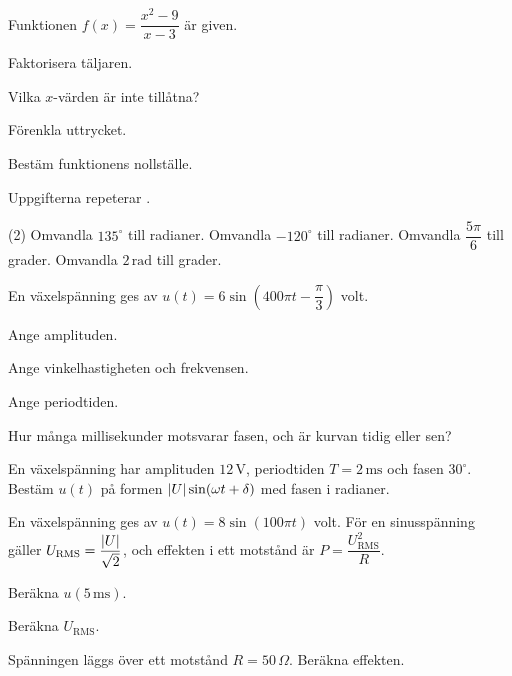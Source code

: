 Funktionen $f(x) = \dfrac{x^2 - 9}{x - 3}$ är given.
\begin{parts}
  \item Faktorisera täljaren.
  \item Vilka $x$-värden är inte tillåtna?
  \item Förenkla uttrycket.
  \item Bestäm funktionens nollställe.
\end{parts}

Uppgifterna repeterar .

\begin{delar}(2)
  \task Omvandla $135^{\circ}$ till radianer.
  \task Omvandla $-120^{\circ}$ till radianer.
  \task Omvandla $\dfrac{5\pi}{6}$ till grader.
  \task Omvandla $2\,\text{rad}$ till grader.
\end{delar}

En växelspänning ges av $u(t) = 6\sin\left(400\pi t - \dfrac{\pi}{3}\right)$ volt.
\begin{parts}
  \item Ange amplituden.
  \item Ange vinkelhastigheten och frekvensen.
  \item Ange periodtiden.
  \item Hur många millisekunder motsvarar fasen, och är kurvan tidig eller sen?
\end{parts}

En växelspänning har amplituden $12\,\text{V}$, periodtiden $T = 2\,\text{ms}$ och fasen
$30^{\circ}$. Bestäm $u(t)$ på formen $\lvert U\rvert\sin(\omega t + \delta)$ med fasen i radianer.

En växelspänning ges av $u(t) = 8\sin(100\pi t)$ volt. För en sinusspänning gäller
$U_{\text{RMS}} = \dfrac{\lvert U\rvert}{\sqrt{2}}$, och effekten i ett motstånd är $P = \dfrac{U_{\text{RMS}}^2}{R}$.
\begin{parts}
  \item Beräkna $u(5\,\text{ms})$.
  \item Beräkna $U_{\text{RMS}}$.
  \item Spänningen läggs över ett motstånd $R = 50\,\Omega$. Beräkna effekten.
\end{parts}

